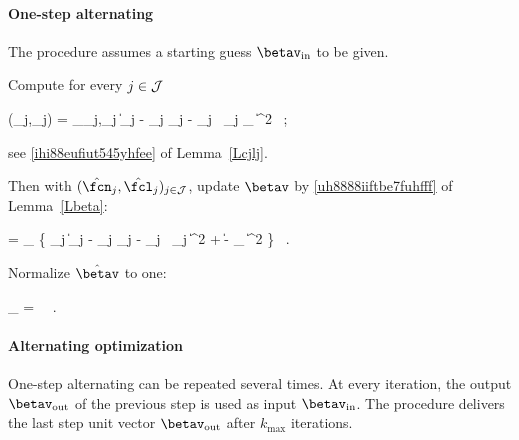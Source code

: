 \paragraph{One-step alternating}
The procedure assumes a starting guess \( \betav_{\init} \) to be given.
%
%
\begin{mylist}
\item 
Compute for every \( j \in \mathcal{J} \)
\begin{EQA}[c]
	(\hat{\fcn}_{j},\hat{\fcl}_{j})
	=
	\arginf_{\fcn_{j},\fcl_{j}} \bigl\| \Imav_{j} - \fcn_{j} \Sv_{j} - \fcl_{j} \, \UV_{j} \betav_{\init} \bigr\|^{2}
	\, ;
\end{EQA}
see \eqref{ihi88eufiut545yhfee} of Lemma~\ref{Lcjlj}.

\item 
Then with \( (\hat{\fcn}_{j},\hat{\fcl}_{j})_{j \in \JJJ} \), update \( \betav \)
by \eqref{uh8888iiftbe7fuhfff} of Lemma~\ref{Lbeta}:
\begin{EQA}[c]
	\hat{\betav}
	=
	\arginf_{\betav} \biggl\{ \sum_{j \in \JJJ} \bigl\| \Imav_{j} - \hat{\fcn}_{j} \Sv_{j} - \hat{\fcl}_{j} \, \UV_{j} \betav \bigr\|^{2}
	+ \lambda \| \betav - \betav_{\init} \|^{2} 
	\biggr\}	
	\, .
\end{EQA}


\item
Normalize \( \hat{\betav} \) to one: 
\begin{EQA}[c]
	\betav_{\outp} 
	= 
	 \, \hat{\betav} 
	\, .
\end{EQA}

\end{mylist}

\paragraph{Alternating optimization}
One-step alternating can be repeated several times.
At every iteration, the output \( \betav_{\outp} \) of the previous step is used as input \( \betav_{\init} \).
The procedure delivers the last step unit vector \( \betav_{\outp} \) after \( k_{\max} \) iterations.



